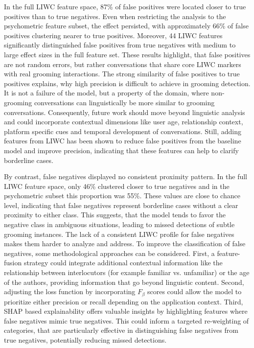 In the full LIWC feature space, 87\% of false positives were located closer to true positives than to true negatives. Even when restricting the analysis to the psychometric feature subset, the effect persisted, with approximately 66\% of false positives clustering nearer to true positives. Moreover, 44 LIWC features significantly distinguished false positives from true negatives with medium to large effect sizes in the full feature set. These results highlight, that false positives are not random errors, but rather conversations that share core LIWC markers with real grooming interactions. The strong similarity of false positives to true positives explains, why high precision is difficult to achieve in grooming detection. It is not a failure of the model, but a property of the domain, where non-grooming conversations can linguistically be more similar to grooming conversations. Consequently, future work should move beyond linguistic analysis and could incorporate contextual dimensions like user age, relationship context, platform specific cues and temporal development of conversations. Still, adding features from LIWC has been shown to reduce false positives from the baseline model and improve precision, indicating that these features can help to clarify borderline cases.

By contrast, false negatives displayed no consistent proximity pattern. In the full LIWC feature space, only 46\% clustered closer to true negatives and in the psychometric subset this proportion was 55\%. These values are close to chance level, indicating that false negatives represent borderline cases without a clear proximity to either class. This suggests, that the model tends to favor the negative class in ambiguous situations, leading to missed detections of subtle grooming instances. The lack of a consistent LIWC profile for false negatives makes them harder to analyze and address. To improve the classification of false negatives, some methodological approaches can be considered. First, a feature-fusion strategy could integrate additional contextual information like the relationship between interlocutors (for example familiar vs. unfamiliar) or the age of the authors, providing information that go beyond linguistic content. Second, adjusting the loss function by incorporating $F_{\beta}$ scores could allow the model to prioritize either precision or recall depending on the application context. Third, SHAP based explainability offers valuable insights by highlighting features where false negatives mimic true negatives. This could inform a targeted re-weighting of categories, that are particularly effective in distinguishing false negatives from true negatives, potentially reducing missed detections.  


